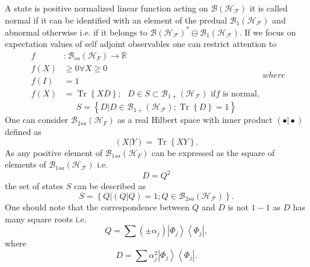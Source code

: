 \documentclass[aps,preprint]{revtex4}%
\begin{document}
A state is positive normalized linear function acting on $\mathcal{B}\left(
\mathcal{H}_{\mathcal{F}}\right)  $ it is called normal if it can be
identified with an element of the predual $\mathcal{B}_{1}\left(
\mathcal{H}_{\mathcal{F}}\right)  $ and abnormal otherwise i.e. if it belongs
to $\mathcal{B}\left(  \mathcal{H}_{\mathcal{F}}\right)  ^{\ast}%
\ominus\mathcal{B}_{1}\left(  \mathcal{H}_{\mathcal{F}}\right)  .$ If we focus
on expectation values of self adjoint observables one can restrict attention
to
\begin{subequations}
\label{States}%
\begin{align}
f  &  :\mathcal{B}_{sa}\left(  \mathcal{H}_{F}\right)  \rightarrow\mathbb{R}\\
f\left(  X\right)   &  \geq0\forall X\geq0\\
f\left(  I\right)   &  =1\\
f\left(  X\right)   &  =\operatorname{Tr}\left\{  XD\right\}  ;\text{ }D\in
S\subset\mathcal{B}_{1+}\left(  \mathcal{H}_{\mathcal{F}}\right)  \text{ if
}f\text{ is normal,}%
\end{align}
where
\end{subequations}
\begin{equation}
S=\left\{  \left.  D\right\vert D\in\mathcal{B}_{1+}\left(  \mathcal{H}%
_{\mathcal{F}}\right)  ;\operatorname{Tr}\left\{  D\right\}  =1\right\}
\end{equation}
One can consider $\mathcal{B}_{2sa}\left(  \mathcal{H}_{F}\right)  $ as a real
Hilbert space with inner product $\left(  \left.  \bullet\right\vert
\bullet\right)  $ defined as
\begin{equation}
\left(  \left.  X\right\vert Y\right)  =\operatorname{Tr}\left\{  XY\right\}
.
\end{equation}
As any positive element of $\mathcal{B}_{1sa}\left(  \mathcal{H}_{F}\right)  $
can be expressed as the square of elements of $\mathcal{B}_{1sa}\left(
\mathcal{H}_{\mathcal{F}}\right)  $ i.e.%
\begin{equation}
D=Q^{2}%
\end{equation}
the set of states $S$ can be described as
\begin{equation}
S=\left\{  \left.  Q\right\vert \left(  \left.  Q\right\vert Q\right)
=1;Q\in\mathcal{B}_{2sa}\left(  \mathcal{H}_{\mathcal{F}}\right)  \right\}  .
\end{equation}
One should note that the correspondence between $Q$ and $D$ is not $1-1$ as
$D$ has many square roots i.e.
\begin{equation}
Q=\sum\left(  \pm\alpha_{j}\right)  \left\vert \Phi_{j}\right\rangle
\left\langle \Phi_{j}\right\vert ,
\end{equation}
where
\begin{equation}
D=\sum\alpha_{j}^{2}\left\vert \Phi_{j}\right\rangle \left\langle \Phi
_{j}\right\vert .
\end{equation}
\end{document}
